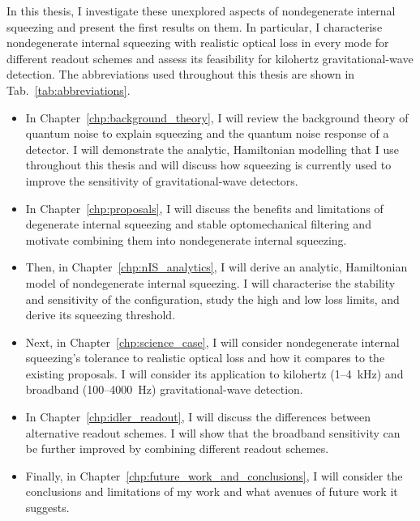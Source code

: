 In this thesis, I investigate these unexplored aspects of nondegenerate internal squeezing and present the first results on them. In particular, I characterise nondegenerate internal squeezing with realistic optical loss in every mode for different readout schemes and assess its feasibility for kilohertz gravitational-wave detection. The abbreviations used throughout this thesis are shown in Tab.~\ref{tab:abbreviations}.
\begin{itemize}
\item In Chapter~\ref{chp:background_theory}, I will review the background theory of quantum noise to explain squeezing and the quantum noise response of a detector. I will demonstrate the analytic, Hamiltonian modelling that I use throughout this thesis and will discuss how squeezing is currently used to improve the sensitivity of gravitational-wave detectors. %
\item In Chapter~\ref{chp:proposals}, I will discuss the benefits and limitations of degenerate internal squeezing and stable optomechanical filtering and motivate combining them into nondegenerate internal squeezing.
\item Then, in Chapter~\ref{chp:nIS_analytics}, I will derive an analytic, Hamiltonian model of nondegenerate internal squeezing. I will characterise the stability and sensitivity of the configuration, study the high and low loss limits, and derive its squeezing threshold. %
\item Next, in Chapter~\ref{chp:science_case}, I will consider nondegenerate internal squeezing's tolerance to realistic optical loss and how it compares to the existing proposals. I will consider its application to kilohertz (1--4~kHz) and broadband (100--4000~Hz) gravitational-wave detection.
\item In Chapter~\ref{chp:idler_readout}, I will discuss the differences between alternative readout schemes. I will show that the broadband sensitivity can be further improved by combining different readout schemes. %
\item Finally, in Chapter~\ref{chp:future_work_and_conclusions}, I will consider the conclusions and limitations of my work and what avenues of future work it suggests.
\end{itemize}



